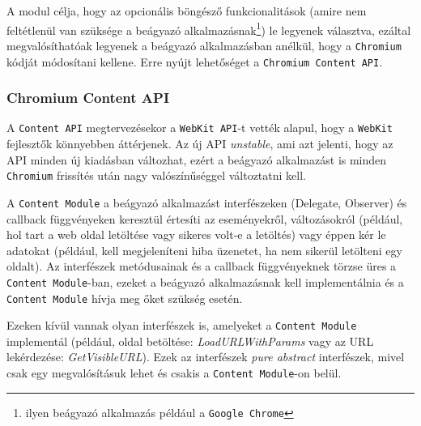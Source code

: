 \documentclass[12pt]{report}
\begin{document}
A modul célja, hogy az opcionális böngésző funkcionalitások (amire nem feltétlenül van
szüksége a beágyazó alkalmazásnak\footnote{ilyen beágyazó alkalmazás például a
\texttt{Google Chrome}}) le legyenek választva, ezáltal megvalósíthatóak legyenek
a beágyazó alkalmazásban anélkül, hogy a \texttt{Chromium} kódját módosítani kellene. Erre
nyújt lehetőséget a \texttt{Chromium Content API}.

\subsubsection{Chromium Content API}
A \texttt{Content API} megtervezésekor a \texttt{WebKit API}-t vették alapul,
hogy a \texttt{WebKit} fejlesztők könnyebben áttérjenek. Az új API \textit{unstable}, ami
azt jelenti, hogy az API minden új kiadásban változhat, ezért a beágyazó alkalmazást is
minden \texttt{Chromium} frissítés után nagy valószínűséggel változtatni kell.

A \texttt{Content Module} a beágyazó alkalmazást interfészeken (Delegate, Observer)
és callback függvényeken keresztül értesíti az eseményekről, változásokról (például,
hol tart a web oldal letöltése vagy sikeres volt-e a letöltés) vagy éppen
kér le adatokat (például, kell megjeleníteni hiba üzenetet, ha nem sikerül letölteni egy
oldalt). Az interfészek metódusainak és a callback függvényeknek törzse üres a
\texttt{Content Module}-ban, ezeket a beágyazó alkalmazásnak kell implementálnia és a
\texttt{Content Module} hívja meg őket szükség esetén.

Ezeken kívül vannak olyan interfészek is, amelyeket a \texttt{Content Module} implementál
(például, oldal betöltése: \textit{LoadURLWithParams} vagy az URL lekérdezése:
\textit{GetVisibleURL}).
Ezek az interfészek \textit{pure abstract} interfészek, mivel csak egy megvalósításuk lehet
és csakis a \texttt{Content Module}-on belül. \cite{bib-chromium-content-api}
\end{document}
